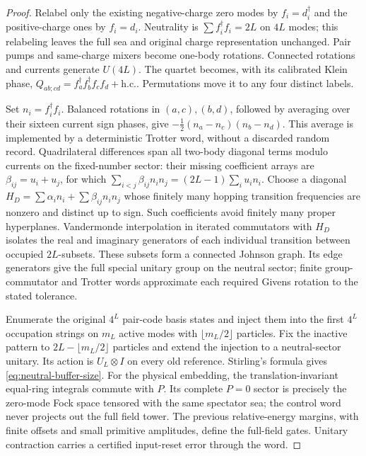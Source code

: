 \begin{proof}
Relabel only the existing negative-charge zero modes by
$f_i=d_i^\dagger$ and the positive-charge ones by $f_i=d_i$.
Neutrality is $\sum f_i^\dagger f_i=2L$ on $4L$ modes; this
relabeling leaves the full sea and original charge representation
unchanged. Pair pumps and same-charge mixers become one-body
rotations. Connected rotations and currents generate $U(4L)$.
The quartet becomes, with its calibrated Klein phase,
$Q_{ab;cd}=f_a^\dagger f_b^\dagger f_cf_d+\mathrm{h.c.}$.
Permutations move it to any four distinct labels.

Set $n_i=f_i^\dagger f_i$. Balanced rotations in $(a,c),(b,d)$,
followed by averaging over their sixteen current sign phases, give
$-\tfrac12(n_a-n_c)(n_b-n_d)$.
This average is implemented by a deterministic Trotter word,
without a discarded random record. Quadrilateral differences span
all two-body diagonal terms modulo currents on the fixed-number
sector: their missing coefficient arrays are
$\beta_{ij}=u_i+u_j$, for which
$\sum_{i<j}\beta_{ij}n_in_j=(2L-1)\sum_i u_in_i$.
Choose a diagonal $H_D=\sum\alpha_i n_i+\sum\beta_{ij}n_in_j$
whose finitely many hopping transition frequencies are nonzero
and distinct up to sign. Such coefficients avoid finitely many
proper hyperplanes. Vandermonde interpolation in iterated
commutators with $H_D$ isolates the real and imaginary generators
of each individual transition between occupied $2L$-subsets.
These subsets form a connected Johnson graph. Its edge generators
give the full special unitary group on the neutral sector; finite
group-commutator and Trotter words approximate each required
Givens rotation to the stated tolerance.

Enumerate the original $4^L$ pair-code basis states and inject them
into the first $4^L$ occupation strings on $m_L$ active modes with
$\lfloor m_L/2\rfloor$ particles. Fix the inactive pattern to
$2L-\lfloor m_L/2\rfloor$ particles and extend the injection to
a neutral-sector unitary. Its action is $U_L\otimes I$ on every
old reference. Stirling's formula gives \eqref{eq:neutral-buffer-size}.
For the physical embedding, the translation-invariant equal-ring
integrals commute with $P$. Its complete $P=0$ sector is precisely
the zero-mode Fock space tensored with the same spectator sea;
the control word never projects out the full field tower. The
previous relative-energy margins, with finite offsets and small
primitive amplitudes, define the full-field gates. Unitary
contraction carries a certified input-reset error through the word.
\end{proof}

